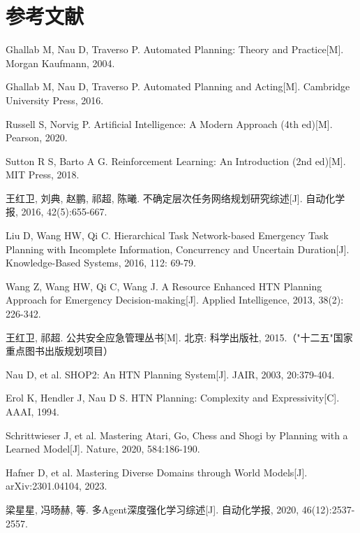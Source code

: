 \documentclass[12pt,a4paper]{ctexart}
\begin{document}
\newpage
\section*{参考文献}

\begin{enumerate}[leftmargin=2em, label={[\arabic*]}]
    \item Ghallab M, Nau D, Traverso P. Automated Planning: Theory and Practice[M]. Morgan Kaufmann, 2004.
    \item Ghallab M, Nau D, Traverso P. Automated Planning and Acting[M]. Cambridge University Press, 2016.
    \item Russell S, Norvig P. Artificial Intelligence: A Modern Approach (4th ed)[M]. Pearson, 2020.
    \item Sutton R S, Barto A G. Reinforcement Learning: An Introduction (2nd ed)[M]. MIT Press, 2018.

    \item 王红卫, 刘典, 赵鹏, 祁超, 陈曦. 不确定层次任务网络规划研究综述[J]. 自动化学报, 2016, 42(5):655-667.
    \item Liu D, Wang HW, Qi C. Hierarchical Task Network-based Emergency Task Planning with Incomplete Information, Concurrency and Uncertain Duration[J]. Knowledge-Based Systems, 2016, 112: 69-79.
    \item Wang Z, Wang HW, Qi C, Wang J. A Resource Enhanced HTN Planning Approach for Emergency Decision-making[J]. Applied Intelligence, 2013, 38(2): 226-342.
    \item 王红卫, 祁超. 公共安全应急管理丛书[M]. 北京: 科学出版社, 2015.（"十二五"国家重点图书出版规划项目）
    \item Nau D, et al. SHOP2: An HTN Planning System[J]. JAIR, 2003, 20:379-404.
    \item Erol K, Hendler J, Nau D S. HTN Planning: Complexity and Expressivity[C]. AAAI, 1994.

    \item Schrittwieser J, et al. Mastering Atari, Go, Chess and Shogi by Planning with a Learned Model[J]. Nature, 2020, 584:186-190.
    \item Hafner D, et al. Mastering Diverse Domains through World Models[J]. arXiv:2301.04104, 2023.
    \item 梁星星, 冯旸赫, 等. 多Agent深度强化学习综述[J]. 自动化学报, 2020, 46(12):2537-2557.


\end{enumerate}
\end{document}

